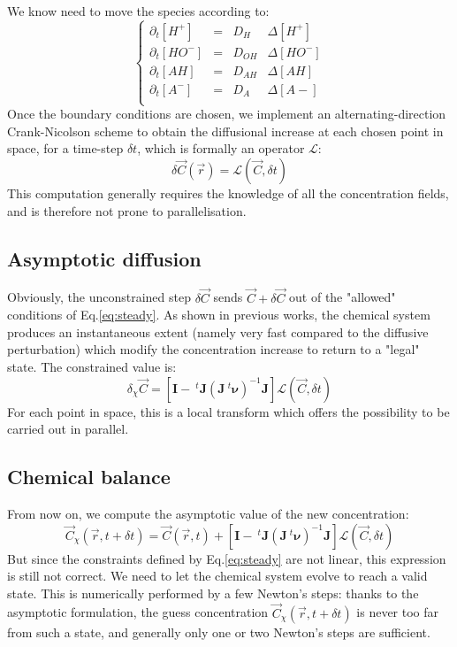 \documentclass[aps,11pt]{revtex4}
\begin{document}
We know need to move the species according to:
\begin{equation}
\label{eq:move}
\left\lbrace
\begin{array}{lcll}
\partial_t [H^+]  & = & D_{H}  &\Delta [H^+]\\
\partial_t [HO^-] & = & D_{OH} &\Delta [HO^-]\\
\partial_t [AH]   & = & D_{AH} &\Delta [AH]\\
\partial_t [A^-]  & = & D_{A}  &\Delta [A-]\\
\end{array}
\right.
\end{equation}
Once the boundary conditions are chosen, we implement an alternating-direction Crank-Nicolson scheme to obtain
the diffusional increase at each chosen point in space, for a time-step $\delta t$, which is formally an operator $\mathcal{L}$:
\begin{equation}
	\delta \vec{C}(\vec{r}) = \mathcal{L}(\vec{C},\delta t)
\end{equation}
This computation generally requires the knowledge of all the concentration fields, and is therefore not prone to parallelisation. 
     
\subsection{Asymptotic diffusion}
Obviously, the unconstrained step $\delta \vec{C}$ sends $\vec{C} + \delta\vec{C}$ out of the "allowed" conditions of Eq.\eqref{eq:steady}.
As shown in previous works, the chemical system produces an instantaneous extent (namely very fast compared to the diffusive perturbation) which
modify the concentration increase to return to a "legal" state. The constrained value is:
\begin{equation}
	\delta_\chi \vec{C} = \left[\bm{I} - ~^t\bm{J}\left(\bm{J}~^t\bm{\nu}\right)^{-1} \bm{J}\right] \mathcal{L}(\vec{C},\delta t)
\end{equation}
For each point in space, this is a local transform which offers the possibility to be carried out in parallel.

\subsection{Chemical balance}
From now on, we compute the asymptotic value of the new concentration:
\begin{equation}
\vec{C}_\chi(\vec{r},t+\delta t) = \vec{C}(\vec{r},t) + \left[\bm{I} - ~^t\bm{J}\left(\bm{J}~^t\bm{\nu}\right)^{-1} \bm{J}\right] \mathcal{L}(\vec{C},\delta t)
\end{equation}  
But since the constraints defined by Eq.\eqref{eq:steady} are not linear, this expression is still not correct.
We need to let the chemical system evolve to reach a valid state. 
This is numerically performed by a few Newton's steps: thanks to the asymptotic formulation, the guess concentration $\vec{C}_\chi(\vec{r},t+\delta t)$ is never too far from such a state, and generally only one or two Newton's steps are sufficient.
  
\end{document}
